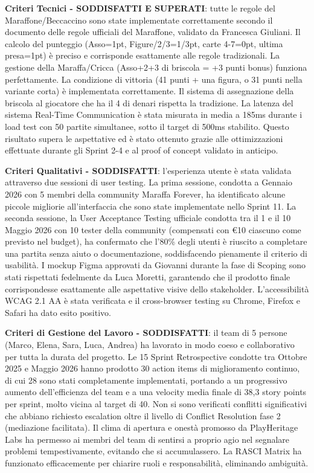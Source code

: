 \textbf{Criteri Tecnici - SODDISFATTI E SUPERATI}: tutte le regole del Maraffone/Beccaccino sono state implementate correttamente secondo il documento delle regole ufficiali del Maraffone, validato da Francesca Giuliani. Il calcolo del punteggio (Asso=1pt, Figure/2/3=1/3pt, carte 4-7=0pt, ultima presa=1pt) è preciso e corrisponde esattamente alle regole tradizionali. La gestione della Maraffa/Cricca (Asso+2+3 di briscola = +3 punti bonus) funziona perfettamente. La condizione di vittoria (41 punti + una figura, o 31 punti nella variante corta) è implementata correttamente. Il sistema di assegnazione della briscola al giocatore che ha il 4 di denari rispetta la tradizione. La latenza del sistema Real-Time Communication è stata misurata in media a 185ms durante i load test con 50 partite simultanee, sotto il target di 500ms stabilito. Questo risultato supera le aspettative ed è stato ottenuto grazie alle ottimizzazioni effettuate durante gli Sprint 2-4 e al proof of concept validato in anticipo.

\textbf{Criteri Qualitativi - SODDISFATTI}: l'esperienza utente è stata validata attraverso due sessioni di user testing. La prima sessione, condotta a Gennaio 2026 con 5 membri della community Maraffa Forever, ha identificato alcune piccole migliorie all'interfaccia che sono state implementate nello Sprint 11. La seconda sessione, la User Acceptance Testing ufficiale condotta tra il 1 e il 10 Maggio 2026 con 10 tester della community (compensati con €10 ciascuno come previsto nel budget), ha confermato che l'80\% degli utenti è riuscito a completare una partita senza aiuto o documentazione, soddisfacendo pienamente il criterio di usabilità. I mockup Figma approvati da Giovanni durante la fase di Scoping sono stati rispettati fedelmente da Luca Moretti, garantendo che il prodotto finale corrispondesse esattamente alle aspettative visive dello stakeholder. L'accessibilità WCAG 2.1 AA è stata verificata e il cross-browser testing su Chrome, Firefox e Safari ha dato esito positivo.

\textbf{Criteri di Gestione del Lavoro - SODDISFATTI}: il team di 5 persone (Marco, Elena, Sara, Luca, Andrea) ha lavorato in modo coeso e collaborativo per tutta la durata del progetto. Le 15 Sprint Retrospective condotte tra Ottobre 2025 e Maggio 2026 hanno prodotto 30 action items di miglioramento continuo, di cui 28 sono stati completamente implementati, portando a un progressivo aumento dell'efficienza del team e a una velocity media finale di 38,3 story points per sprint, molto vicina al target di 40. Non si sono verificati conflitti significativi che abbiano richiesto escalation oltre il livello di Conflict Resolution fase 2 (mediazione facilitata). Il clima di apertura e onestà promosso da PlayHeritage Labs ha permesso ai membri del team di sentirsi a proprio agio nel segnalare problemi tempestivamente, evitando che si accumulassero. La RASCI Matrix ha funzionato efficacemente per chiarire ruoli e responsabilità, eliminando ambiguità.

